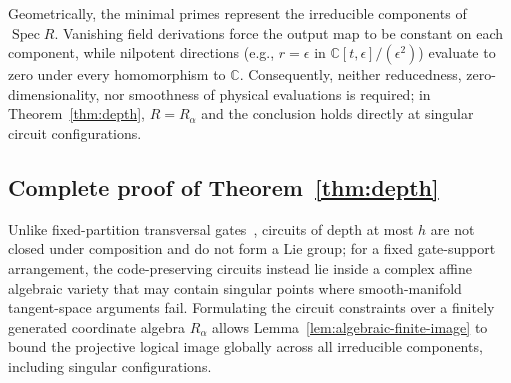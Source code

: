\documentclass[aps,prl,reprint,notitlepage,nofootinbib,nobibnotes]{revtex4-2}
\begin{document}
Geometrically, the minimal primes represent the irreducible components of \(\operatorname{Spec} R\). Vanishing field derivations force the output map to be constant on each component, while nilpotent directions (e.g., \(r=\epsilon\) in \(\mathbb C[t,\epsilon]/(\epsilon^2)\)) evaluate to zero under every homomorphism to \(\mathbb C\). Consequently, neither reducedness, zero-dimensionality, nor smoothness of physical evaluations is required; in Theorem~\ref{thm:depth}, \(R=R_\alpha\) and the conclusion holds directly at singular circuit configurations.

\subsection*{Complete proof of Theorem~\ref{thm:depth}}
\label{sm:proof-thm-depth}

Unlike fixed-partition transversal gates~\cite{EK,Faist,LiuZhou}, circuits of depth at most \(h\) are not closed under composition and do not form a Lie group; for a fixed gate-support arrangement, the code-preserving circuits instead lie inside a complex affine algebraic variety that may contain singular points where smooth-manifold tangent-space arguments fail. Formulating the circuit constraints over a finitely generated coordinate algebra \(R_\alpha\) allows Lemma~\ref{lem:algebraic-finite-image} to bound the projective logical image globally across all irreducible components, including singular configurations.
\end{document}

